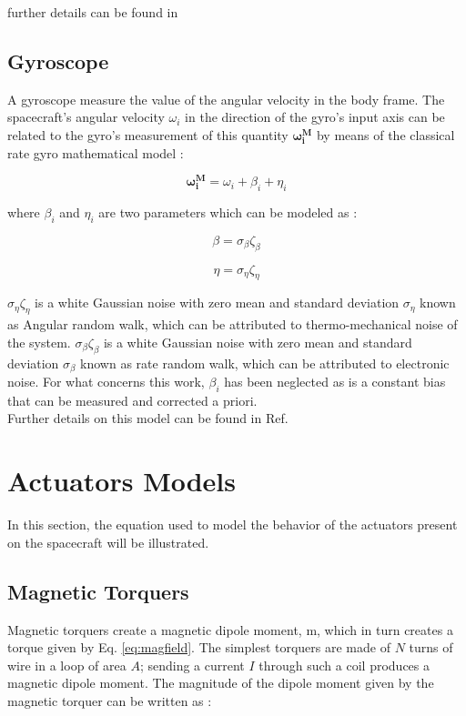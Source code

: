 \documentclass[11pt,a4paper]{report}
\begin{document}
further details can be found in \cite{notes:bigss}

\subsection{Gyroscope}
A gyroscope measure the value of the angular velocity in the body frame.
The spacecraft's angular velocity $\omega_{i}$ in the direction of the gyro's input axis can be related to the gyro's measurement of this quantity $\mathbf{\omega_{i}^{M}}$ by means of the classical rate gyro mathematical model : 

\begin{equation}
 \mathbf{\omega_{i}^{M}} = \omega_{i} + \beta_{i} + \eta_{i}
\end{equation}

where  $\beta_{i}$ and $\eta_{i}$ are two parameters which can be modeled as :

\begin{equation*}
 \beta = \sigma_{\beta} \zeta_{\beta}
\end{equation*}

\begin{equation*}
 \eta = \sigma_{\eta} \zeta_{\eta}
\end{equation*}

$\sigma_{\eta} \zeta_{\eta}$ is a white Gaussian noise with zero mean and standard deviation $\sigma_{\eta}$ known as Angular random walk, which can be attributed to thermo-mechanical noise of the system.
$\sigma_{\beta} \zeta_{\beta}$ is a white Gaussian noise with zero mean and standard deviation $\sigma_{\beta}$ known as rate random walk, which can be attributed to electronic noise.
For what concerns this work, $\beta_{i}$ has been neglected as is a constant bias that can be measured and corrected a priori.\\
Further details on this model can be found in Ref. \cite{Ref:Books:wertz}

\section{Actuators Models}
In this section, the equation used to model the behavior of the actuators present on the spacecraft will be illustrated.

\subsection{Magnetic Torquers}
Magnetic torquers create a magnetic dipole moment, m, which in turn creates a torque given by Eq. \ref{eq:magfield}. 
The simplest torquers are made of $N$ turns of wire in a loop of area $A$; sending a current $I$ through such a coil produces a magnetic dipole moment.
The magnitude of the dipole moment given by the magnetic torquer can be written as :
\end{document}
